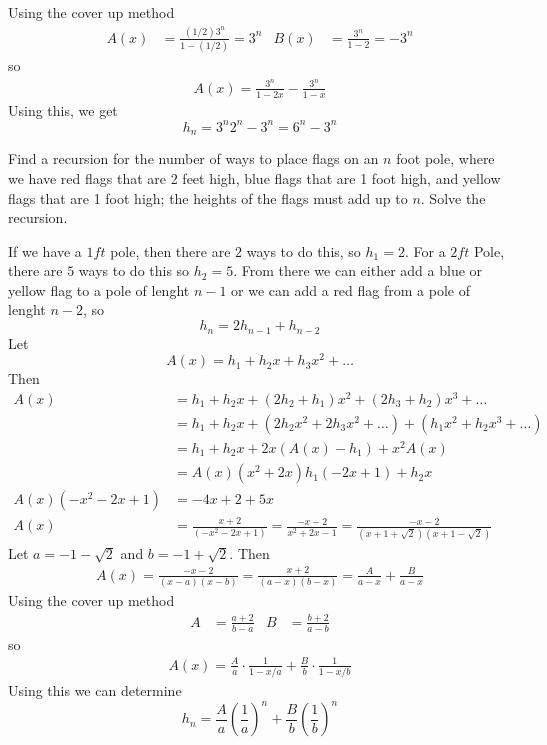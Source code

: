 \documentclass[12pt]{article}
\newenvironment{exercise}[2][Exercise]{\begin{trivlist}
\item[\hskip \labelsep {\bfseries #1} \hskip \labelsep {\bfseries #2.}]}{\end{trivlist}}
\begin{document}
Using the cover up method
\begin{align*}
	A(x) &= \frac{(1/2)3^n}{1 - (1/2)} = 3^n & B(x) &= \frac{3^n}{1 - 2} = -3^n
\end{align*}
so
\begin{align*}
	A(x) = \frac{3^n}{1 - 2x} - \frac{3^n}{1 -x}
\end{align*}
Using this, we get
\[
	h_n = 3^n2^n - 3^n = 6^n - 3^n
\]
\begin{exercise}{3.4.8 (2pt)}
	Find a recursion for the number of ways to place flags on an $n$ foot pole, where we have red flags that are 2 feet high, blue flags that are 1 foot high, and yellow flags that are 1 foot high; the heights of the flags must add up to $n$. Solve the recursion. 
\end{exercise}	
If we have a $1ft$ pole, then there are $2$ ways to do this, so $h_1 = 2$. For a $2ft$ Pole, there are $5$ ways to do this so $h_2 = 5$. From there we can either add a blue or yellow flag to a pole of lenght $n-1$ or we can add a red flag from a pole of lenght $n - 2$, so
\[
	h_n = 2h_{n-1} + h_{n-2}
\]
Let
\[
	A(x) = h_1 + h_2x + h_3x^2 + \ldots
\]
Then
\begin{align*}
	A(x) &= h_1 + h_2x + (2h_2 + h_1)x^2 + (2h_3 + h_2)x^3 + \ldots \\
	     &= h_1 + h_2x + (2h_2x^2 + 2h_3x^2 + \ldots) + (h_1x^2 + h_2x^3 + \ldots) \\
	     &= h_1 + h_2x + 2x(A(x) - h_1) + x^2A(x) \\
	     &= A(x)(x^2 + 2x) h_1(-2x + 1) + h_2x \\
	A(x)(-x^2 - 2x + 1) &= -4x + 2 + 5x \\
	A(x) &= \frac{x + 2}{(-x^2 -2x +1)} = \frac{-x - 2}{x^2 + 2x - 1} = \frac{-x - 2}{(x + 1 + \sqrt{2})(x + 1 - \sqrt{2})}
\end{align*}
Let $a = -1 - \sqrt{2}$ and $b = -1 + \sqrt{2}$. Then
\begin{align*}
	A(x) = \frac{-x -2}{(x - a)(x - b)} = \frac{x + 2}{(a - x)(b - x)} = \frac{A}{a - x} + \frac{B}{a - x}
\end{align*}
Using the cover up method
\begin{align*}
	A &= \frac{a + 2}{b - a} & B &= \frac{b + 2}{a - b}
\end{align*}
so
\begin{align*}
	A(x) = \frac{A}{a}\cdot\frac{1}{1 - x/a} + \frac{B}{b}\cdot\frac{1}{1 - x/b}
\end{align*}
Using this we can determine
\[
	h_n = \frac{A}{a}\left(\frac{1}{a}\right)^n + \frac{B}{b}\left(\frac{1}{b}\right)^n
\]
\end{document}
